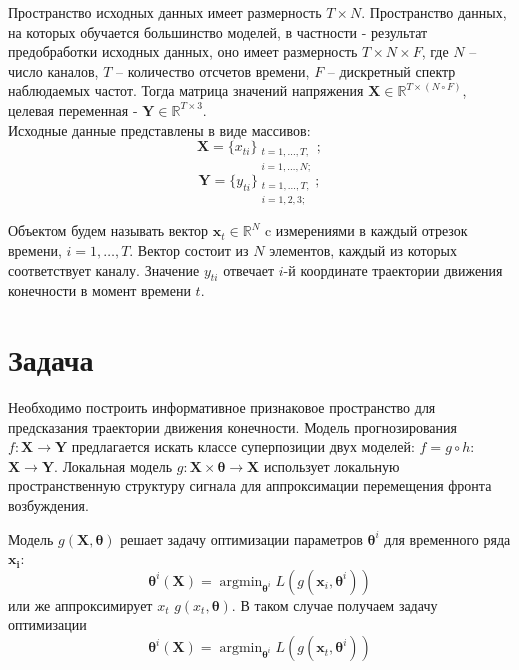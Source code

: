 \documentclass{mipt-thesis-bs}
\newcommand{\argmin}{\mathop{\mathrm{argmin}}}
\begin{document}
Пространство исходных данных имеет размерность $T \times N$. Пространство данных, на которых обучается большинство моделей, в частности \cite{Motrenko 2018} - результат предобработки исходных данных, оно имеет размерность $T \times N \times F$, где $N$ – число каналов, $T$ – количество отсчетов времени, $F$ – дискретный спектр наблюдаемых частот. Тогда матрица значений напряжения $\mathbf{X} \in \mathbb{R}^{T \times (N \circ F)}$, целевая переменная - $\mathbf{Y} \in \mathbb{R}^{T \times 3}$. \\


Исходные данные представлены в виде массивов:
\begin{equation}
\mathbf{X} = \{x_{ti}\}_{\substack{t=1,\dots,T,\\ i=1,\dots,N;}};
\end{equation} 
\begin{equation}
\mathbf{Y} = \{y_{ti}\}_{\substack{t=1,\dots,T,\\ i=1,2,3;}};
\end{equation}

Объектом будем называть вектор $\mathbf{x}_t \in \mathbb{R}^{N}$ c измерениями в каждый отрезок времени, $i = 1,\dots,T$. Вектор состоит из $N$ элементов, каждый из которых соответствует каналу. Значение $y_{ti}$ отвечает $i$-й координате траектории движения конечности в момент времени $t$.\\

\section{Задача}
Необходимо построить информативное признаковое пространство для предсказания траектории движения конечности. Модель прогнозирования $f:\mathbf{X}\to\mathbf{Y}$ предлагается искать классе суперпозиции двух моделей: $f = g \circ h:$ $\mathbf{X}\to\mathbf{Y}$. Локальная модель $g:\mathbf{X}\times\mathbf{\theta}\to\mathbf{X}$ использует локальную пространственную структуру сигнала для аппроксимации перемещения фронта возбуждения.
 
Модель $g(\mathbf{X}, \mathbf{\theta})$ решает задачу оптимизации параметров $\mathbf{\theta}^{i}$ для временного ряда $\mathbf{x_{i}}$:
\begin{equation}
\mathbf{\theta}^i(\mathbf{X}) = \argmin_{\mathbf{\theta}^i} L(g(\mathbf{x}_i, \mathbf{\theta}^i))
\end{equation}
или же аппроксимирует $x_t$ $g(x_t, \mathbf{\theta})$. В таком случае получаем задачу оптимизации 
\begin{equation}
\mathbf{\theta}^i(\mathbf{X}) = \argmin_{\mathbf{\theta}^i} L(g(\mathbf{x}_t, \mathbf{\theta}^i))
\end{equation}
\end{document}
